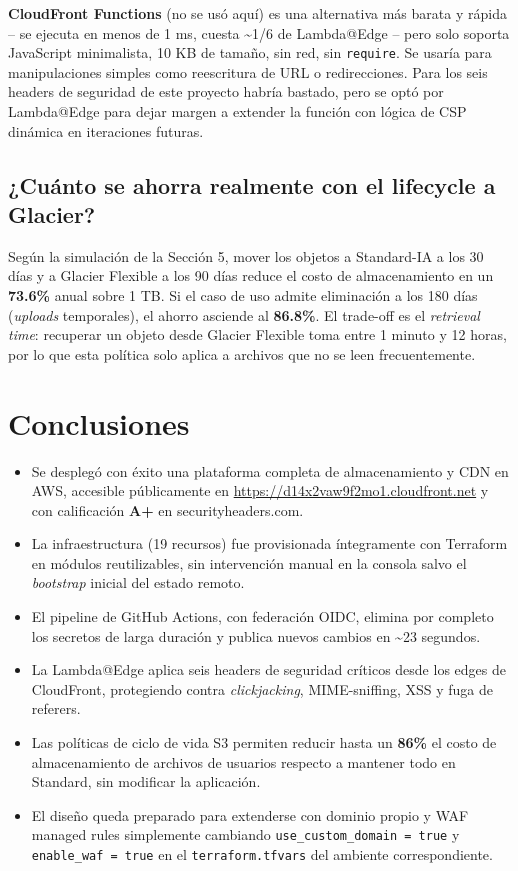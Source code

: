 \documentclass[12pt,a4paper]{report}
\begin{document}
\textbf{CloudFront Functions} (no se usó aquí) es una alternativa más barata y rápida -- se ejecuta en menos de 1 ms, cuesta \~{}1/6 de Lambda@Edge -- pero solo soporta JavaScript minimalista, 10 KB de tamaño, sin red, sin \texttt{require}. Se usaría para manipulaciones simples como reescritura de URL o redirecciones. Para los seis headers de seguridad de este proyecto habría bastado, pero se optó por Lambda@Edge para dejar margen a extender la función con lógica de CSP dinámica en iteraciones futuras.

\subsection{¿Cuánto se ahorra realmente con el lifecycle a Glacier?}

Según la simulación de la Sección 5, mover los objetos a Standard-IA a los 30 días y a Glacier Flexible a los 90 días reduce el costo de almacenamiento en un \textbf{73.6\%} anual sobre 1 TB. Si el caso de uso admite eliminación a los 180 días (\textit{uploads} temporales), el ahorro asciende al \textbf{86.8\%}. El trade-off es el \textit{retrieval time}: recuperar un objeto desde Glacier Flexible toma entre 1 minuto y 12 horas, por lo que esta política solo aplica a archivos que no se leen frecuentemente.

\section{Conclusiones}

\begin{itemize}
    \item Se desplegó con éxito una plataforma completa de almacenamiento y CDN en AWS, accesible públicamente en \url{https://d14x2vaw9f2mo1.cloudfront.net} y con calificación \textbf{A+} en securityheaders.com.
    \item La infraestructura (19 recursos) fue provisionada íntegramente con Terraform en módulos reutilizables, sin intervención manual en la consola salvo el \textit{bootstrap} inicial del estado remoto.
    \item El pipeline de GitHub Actions, con federación OIDC, elimina por completo los secretos de larga duración y publica nuevos cambios en \textasciitilde 23 segundos.
    \item La Lambda@Edge aplica seis headers de seguridad críticos desde los edges de CloudFront, protegiendo contra \textit{clickjacking}, MIME-sniffing, XSS y fuga de referers.
    \item Las políticas de ciclo de vida S3 permiten reducir hasta un \textbf{86\%} el costo de almacenamiento de archivos de usuarios respecto a mantener todo en Standard, sin modificar la aplicación.
    \item El diseño queda preparado para extenderse con dominio propio y WAF managed rules simplemente cambiando \texttt{use\_custom\_domain = true} y \texttt{enable\_waf = true} en el \texttt{terraform.tfvars} del ambiente correspondiente.
\end{itemize}
\end{document}
